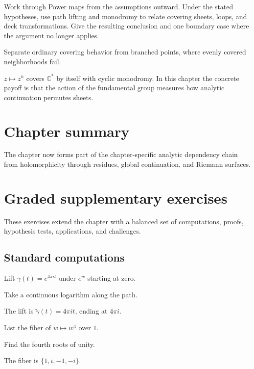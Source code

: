 \begin{exercise}\label{exr:iv23-08}
Work through Power maps from the assumptions outward. Under the stated hypotheses, use path lifting and monodromy to relate covering sheets, loops, and deck transformations. Give the resulting conclusion and one boundary case where the argument no longer applies.
\end{exercise}
\begin{hint}
Separate ordinary covering behavior from branched points, where evenly covered neighborhoods fail.
\end{hint}
\begin{solution}
$z\mapsto z^n$ covers $\mathbb C^*$ by itself with cyclic monodromy. In this chapter the concrete payoff is that the action of the fundamental group measures how analytic continuation permutes sheets.
\end{solution}

\section*{Chapter summary}
The chapter now forms part of the chapter-specific analytic dependency chain from holomorphicity through residues, global continuation, and Riemann surfaces.
\section{Graded supplementary exercises}
These exercises extend the chapter with a balanced set of computations, proofs, hypothesis tests, applications, and challenges.

\subsection*{Standard computations}

\begin{exercise}\label{exr:iv23-expand-01}
Lift \(\gamma(t)=e^{4\pi it}\) under \(e^w\) starting at zero.
\end{exercise}
\begin{hint}
Take a continuous logarithm along the path.
\end{hint}
\begin{solution}
The lift is \(\widetilde\gamma(t)=4\pi it\), ending at \(4\pi i\).
\end{solution}

\begin{exercise}\label{exr:iv23-expand-02}
List the fiber of \(w\mapsto w^4\) over \(1\).
\end{exercise}
\begin{hint}
Find the fourth roots of unity.
\end{hint}
\begin{solution}
The fiber is \(\{1,i,-1,-i\}\).
\end{solution}

